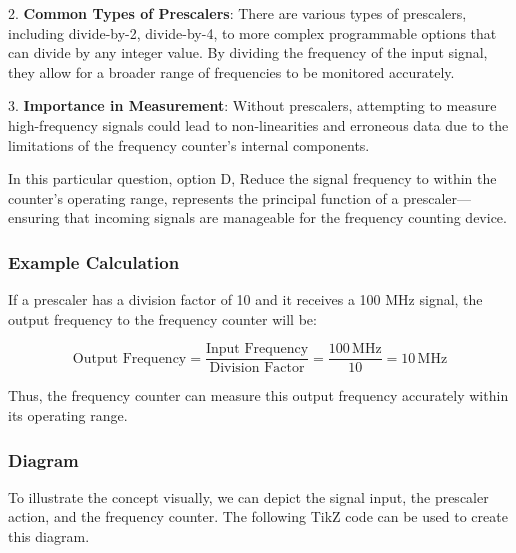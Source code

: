 2. \textbf{Common Types of Prescalers}: There are various types of prescalers, including divide-by-2, divide-by-4, to more complex programmable options that can divide by any integer value. By dividing the frequency of the input signal, they allow for a broader range of frequencies to be monitored accurately.

3. \textbf{Importance in Measurement}: Without prescalers, attempting to measure high-frequency signals could lead to non-linearities and erroneous data due to the limitations of the frequency counter's internal components.

In this particular question, option D, Reduce the signal frequency to within the counter's operating range, represents the principal function of a prescaler—ensuring that incoming signals are manageable for the frequency counting device.

\subsubsection{Example Calculation}
If a prescaler has a division factor of 10 and it receives a 100 MHz signal, the output frequency to the frequency counter will be:

\[
\text{Output Frequency} = \frac{\text{Input Frequency}}{\text{Division Factor}} = \frac{100 \, \text{MHz}}{10} = 10 \, \text{MHz}
\]

Thus, the frequency counter can measure this output frequency accurately within its operating range.

\subsubsection{Diagram}
To illustrate the concept visually, we can depict the signal input, the prescaler action, and the frequency counter. The following TikZ code can be used to create this diagram.

\begin{center}
\end{center}
